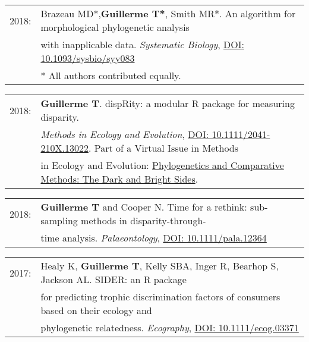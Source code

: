 \documentclass[10pt,a4paper]{article}
\begin{document}
{\begin{tabular}{ll}
2018: & Brazeau MD*,\textbf{Guillerme T*}, Smith MR*. An algorithm for morphological phylogenetic analysis \\
      & with inapplicable data. \textit{Systematic Biology}, \href{https://doi.org/10.1093/sysbio/syy083}{DOI: 10.1093/sysbio/syy083}\\
      & \footnotesize{* All authors contributed equally.}
\end{tabular}

\bigskip

\begin{tabular}{ll}
2018: & \textbf{Guillerme T}. dispRity: a modular R package for measuring disparity.\\
      & \textit{Methods in Ecology and Evolution}, \href{https://besjournals.onlinelibrary.wiley.com/doi/abs/10.1111/2041-210X.13022}{DOI: 10.1111/2041-210X.13022}. Part of a Virtual Issue in Methods\\
      & in Ecology and Evolution: \href{https://besjournals.onlinelibrary.wiley.com/doi/toc/10.1111/(ISSN)2041-210X.PhylogeneticsMEE2019}{Phylogenetics and Comparative Methods: The Dark and Bright Sides}.\\

\end{tabular}

\bigskip

\begin{tabular}{ll}
2018: & \textbf{Guillerme T} and Cooper N. Time for a rethink: sub-sampling methods in disparity-through-\\
      & time analysis. \textit{Palaeontology}, \href{https://onlinelibrary.wiley.com/doi/abs/10.1111/pala.12364}{DOI: 10.1111/pala.12364}\\
\end{tabular}

\bigskip

\begin{tabular}{ll}
2017: & Healy K, \textbf{Guillerme T}, Kelly SBA, Inger R, Bearhop S, Jackson AL. SIDER: an R package\\
      & for predicting trophic discrimination factors of consumers based on their ecology and\\
      & phylogenetic relatedness. \textit{Ecography}, \href{http://onlinelibrary.wiley.com/doi/10.1111/ecog.03371/full}{DOI: 10.1111/ecog.03371}\\
\end{tabular}

}
\end{document}
